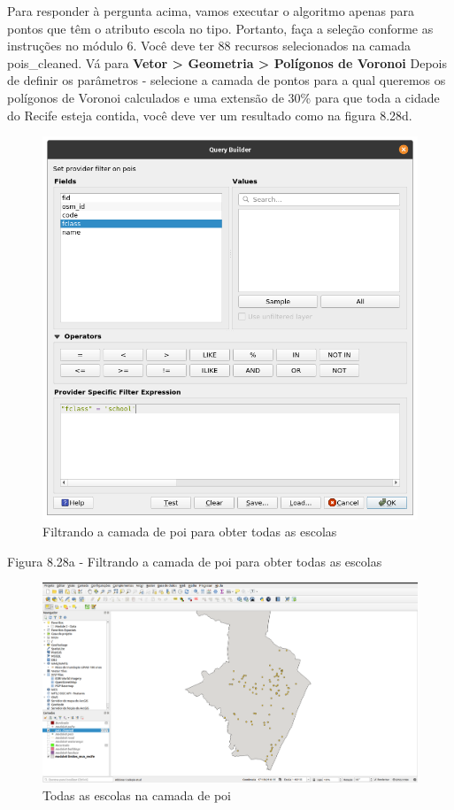 \documentclass[
]{krantz}
\begin{document}
Para responder à pergunta acima, vamos executar o algoritmo apenas para pontos que têm o atributo escola no tipo. Portanto, faça a seleção conforme as instruções no módulo 6. Você deve ter 88 recursos selecionados na camada pois\_cleaned. Vá para \textbf{Vetor \textgreater{} Geometria \textgreater{} Polígonos de Voronoi} Depois de definir os parâmetros - selecione a camada de pontos para a qual queremos os polígonos de Voronoi calculados e uma extensão de 30\% para que toda a cidade do Recife esteja contida, você deve ver um resultado como na figura 8.28d.

\begin{figure}
\centering
\includegraphics{media/modulo8/fig828_a.png}
\caption{Filtrando a camada de poi para obter todas as escolas}
\end{figure}

Figura 8.28a - Filtrando a camada de poi para obter todas as escolas

\begin{figure}
\centering
\includegraphics{media/modulo8/fig828_b.png}
\caption{Todas as escolas na camada de poi}
\end{figure}
\end{document}
